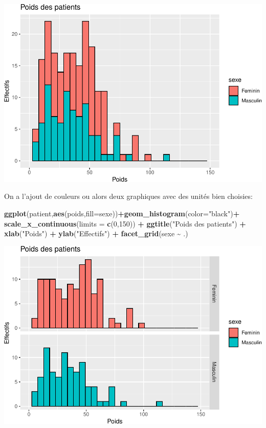 \documentclass[
]{book}
\newenvironment{Shaded}{\begin{snugshade}}{\end{snugshade}}
\newcommand{\AttributeTok}[1]{\textcolor[rgb]{0.13,0.29,0.53}{#1}}
\newcommand{\DecValTok}[1]{\textcolor[rgb]{0.00,0.00,0.81}{#1}}
\newcommand{\FunctionTok}[1]{\textcolor[rgb]{0.13,0.29,0.53}{\textbf{#1}}}
\newcommand{\NormalTok}[1]{#1}
\newcommand{\SpecialCharTok}[1]{\textcolor[rgb]{0.81,0.36,0.00}{\textbf{#1}}}
\newcommand{\StringTok}[1]{\textcolor[rgb]{0.31,0.60,0.02}{#1}}
\begin{document}
\includegraphics{_main_files/figure-latex/ggplot8-1.pdf}

On a l'ajout de couleurs ou alors deux graphiques avec des unités bien choisies:

\begin{Shaded}
\begin{Highlighting}[]
\FunctionTok{ggplot}\NormalTok{(patient,}\FunctionTok{aes}\NormalTok{(poids,}\AttributeTok{fill=}\NormalTok{sexe))}\SpecialCharTok{+}\FunctionTok{geom\_histogram}\NormalTok{(}\AttributeTok{color=}\StringTok{"black"}\NormalTok{)}\SpecialCharTok{+}
  \FunctionTok{scale\_x\_continuous}\NormalTok{(}\AttributeTok{limits =} \FunctionTok{c}\NormalTok{(}\DecValTok{0}\NormalTok{,}\DecValTok{150}\NormalTok{)) }\SpecialCharTok{+} 
  \FunctionTok{ggtitle}\NormalTok{(}\StringTok{"Poids des patients"}\NormalTok{) }\SpecialCharTok{+} 
  \FunctionTok{xlab}\NormalTok{(}\StringTok{"Poids"}\NormalTok{) }\SpecialCharTok{+} 
  \FunctionTok{ylab}\NormalTok{(}\StringTok{"Effectifs"}\NormalTok{) }\SpecialCharTok{+}
  \FunctionTok{facet\_grid}\NormalTok{(sexe }\SpecialCharTok{\textasciitilde{}}\NormalTok{ .)}
\end{Highlighting}
\end{Shaded}

\includegraphics{_main_files/figure-latex/ggplot9-1.pdf}
\end{document}
